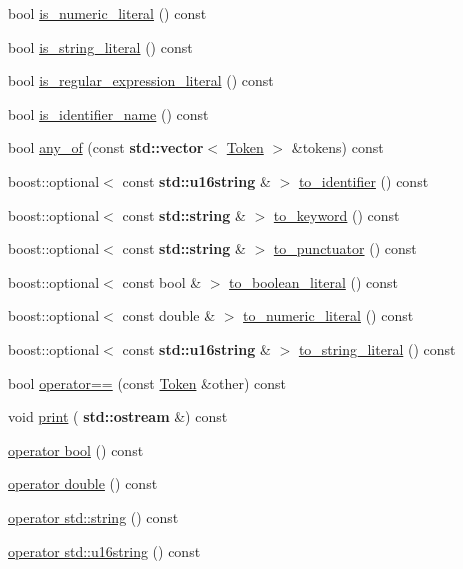 \begin{DoxyCompactItemize}
\item 
bool \hyperlink{class_token_acf4f9a4d866ea0b67054b01cd4ea4f0f}{is\+\_\+numeric\+\_\+literal} () const
\item 
bool \hyperlink{class_token_ad11f807932449af30ca904eac2e4a350}{is\+\_\+string\+\_\+literal} () const
\item 
bool \hyperlink{class_token_a067bf14791d50fb4d98f3bb67de26307}{is\+\_\+regular\+\_\+expression\+\_\+literal} () const
\item 
bool \hyperlink{class_token_a00ae85f794f2c6a2da22b1454ecd4e84}{is\+\_\+identifier\+\_\+name} () const
\item 
bool \hyperlink{class_token_a45256af5fdc822d729ec7294d4edf52d}{any\+\_\+of} (const \textbf{ std\+::vector}$<$ \hyperlink{class_token}{Token} $>$ \&tokens) const
\item 
boost\+::optional$<$ const \textbf{ std\+::u16string} \& $>$ \hyperlink{class_token_a26d2e0e166ea03a4a7c2a7b77d456283}{to\+\_\+identifier} () const
\item 
boost\+::optional$<$ const \textbf{ std\+::string} \& $>$ \hyperlink{class_token_a4438811e8b488dc71a8ae518368cc962}{to\+\_\+keyword} () const
\item 
boost\+::optional$<$ const \textbf{ std\+::string} \& $>$ \hyperlink{class_token_ad68665bd46eea1e372e6ed9dade2f713}{to\+\_\+punctuator} () const
\item 
boost\+::optional$<$ const bool \& $>$ \hyperlink{class_token_a1be97c731f423827dd4725de8eb2a41f}{to\+\_\+boolean\+\_\+literal} () const
\item 
boost\+::optional$<$ const double \& $>$ \hyperlink{class_token_a6f9a344002940cb1ee6e29a7ae9a178a}{to\+\_\+numeric\+\_\+literal} () const
\item 
boost\+::optional$<$ const \textbf{ std\+::u16string} \& $>$ \hyperlink{class_token_a90405a7051a618d8f838bb2abee8709d}{to\+\_\+string\+\_\+literal} () const
\item 
bool \hyperlink{class_token_a20c14983ac6c11ffb89135e2cd91169f}{operator==} (const \hyperlink{class_token}{Token} \&other) const
\item 
void \hyperlink{class_token_a50f3ddd1f75c6ae38e0156dd16796a9e}{print} (\textbf{ std\+::ostream} \&) const
\item 
\hyperlink{class_token_a34140d60656a12bbfcdfbcf85e985133}{operator bool} () const
\item 
\hyperlink{class_token_a9d9ecf295a7bb23922db6ea5b9e97833}{operator double} () const
\item 
\hyperlink{class_token_a37a03ca940a3abaec1491c9306bafa2a}{operator std\+::string} () const
\item 
\hyperlink{class_token_a4a746b837b7c624604a093eef1e88b12}{operator std\+::u16string} () const
\end{DoxyCompactItemize}
